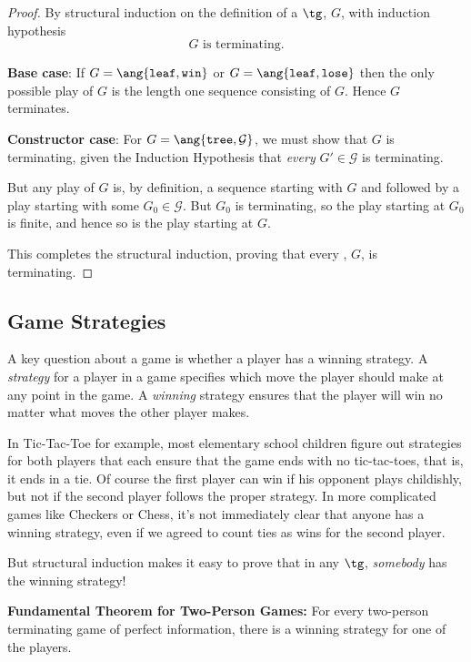 \begin{definition}
\begin{proof}
By structural induction on the definition of a $\tg$, $G$, with induction
hypothesis
\[
G \text{ is terminating}.
\]

\textbf{Base case}: If $G = \ang{\texttt{leaf}, \texttt{win}}$ or $G =
\ang{\texttt{leaf}, \texttt{lose}}$ then the only possible play of $G$ is
the length one sequence consisting of $G$.  Hence $G$ terminates.

\textbf{Constructor case}: For $G = \ang{\texttt{tree},\mathcal{G}}$, we
must show that $G$ is terminating, given the Induction Hypothesis that
\emph{every} $G' \in \mathcal{G}$ is terminating.

But any play of $G$ is, by definition, a sequence starting with $G$ and
followed by a play starting with some $G_0 \in \mathcal{G}$.  But $G_0$ is
terminating, so the play starting at $G_0$ is finite, and hence so is the
play starting at $G$.

This completes the structural induction, proving that every \tg, $G$, is
terminating.
\end{proof}


\subsection{Game Strategies}

A key question about a game is whether a player has a winning strategy.  A
\emph{strategy} for a player in a game specifies which move the player
should make at any point in the game.  A \emph{winning} strategy ensures
that the player will win no matter what moves the other player makes.

In Tic-Tac-Toe for example, most elementary school children figure out
strategies for both players that each ensure that the game ends with no
tic-tac-toes, that is, it ends in a tie.  Of course the first player can
win if his opponent plays childishly, but not if the second player follows
the proper strategy.  In more complicated games like Checkers or Chess,
it's not immediately clear that anyone has a winning strategy, even if we
agreed to count ties as wins for the second player.

But structural induction makes it easy to prove that in any $\tg$,
\emph{somebody} has the winning strategy!

\begin{theorem}\label{fund}
\textbf{Fundamental Theorem for Two-Person Games:} For every two-person
terminating game of perfect information, there is a winning strategy for
one of the players.
\end{theorem}


\end{definition}
